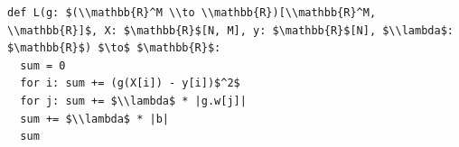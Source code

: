 \documentclass[border=10pt]{standalone}
\begin{document}
\begin{lstlisting}
def L(g: $(\\mathbb{R}^M \\to \\mathbb{R})[\\mathbb{R}^M, \\mathbb{R}]$, X: $\mathbb{R}$[N, M], y: $\mathbb{R}$[N], $\\lambda$: $\mathbb{R}$) $\to$ $\mathbb{R}$:
  sum = 0
  for i: sum += (g(X[i]) - y[i])$^2$
  for j: sum += $\\lambda$ * |g.w[j]|
  sum += $\\lambda$ * |b|
  sum
\end{lstlisting}
\end{document}

